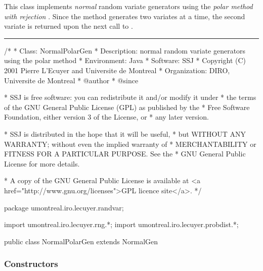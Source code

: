 
This class implements {\em normal\/} random variate generators using
 the {\em polar method with rejection} \cite{rMAR62a}.
Since the method generates two variates at a time,
the second variate is returned upon the next call to .


\bigskip\hrule

\begin{code}
\begin{hide}
/*
 * Class:        NormalPolarGen
 * Description:  normal random variate generators using the polar method
 * Environment:  Java
 * Software:     SSJ 
 * Copyright (C) 2001  Pierre L'Ecuyer and Universite de Montreal
 * Organization: DIRO, Universite de Montreal
 * @author       
 * @since

 * SSJ is free software: you can redistribute it and/or modify it under
 * the terms of the GNU General Public License (GPL) as published by the
 * Free Software Foundation, either version 3 of the License, or
 * any later version.

 * SSJ is distributed in the hope that it will be useful,
 * but WITHOUT ANY WARRANTY; without even the implied warranty of
 * MERCHANTABILITY or FITNESS FOR A PARTICULAR PURPOSE.  See the
 * GNU General Public License for more details.

 * A copy of the GNU General Public License is available at
   <a href="http://www.gnu.org/licenses">GPL licence site</a>.
 */
\end{hide}
package umontreal.iro.lecuyer.randvar;\begin{hide}
import umontreal.iro.lecuyer.rng.*;
import umontreal.iro.lecuyer.probdist.*;
\end{hide}

public class NormalPolarGen extends NormalGen \begin{hide} {

   // used by polar method which calculate always two random values;
   private boolean available = false;
   private double[] variates = new double[2];
   private static double[] staticVariates = new double[2];
\end{hide}\end{code}

\subsubsection* {Constructors}

